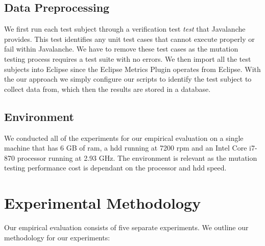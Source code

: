 \subsection{Data Preprocessing}
\label{subsec:experiment_data_preprocessing}
We first run each test subject through a verification test \emph{test} that Javalanche provides. This test identifies any unit test cases that cannot execute properly or fail within Javalanche. We have to remove these test cases as the mutation testing process requires a test suite with no errors. We then import all the test subjects into Eclipse since the Eclipse Metrics Plugin operates from Eclipse. With the our approach we simply configure our scripts to identify the test subject to collect data from, which then the results are stored in a database.


\subsection{Environment}
\label{subsec:experiment_environment}
We conducted all of the experiments for our empirical evaluation on a single machine that has 6 GB of \gls{ram}, a \gls{hdd} running at 7200 \gls{rpm}  and an Intel Core i7-870 processor running at 2.93 GHz. The environment is relevant as the mutation testing performance cost is dependant on the processor and \gls{hdd} speed.


\section{Experimental Methodology}
\label{sec:experiment_methodology}
Our empirical evaluation consists of five separate experiments. We outline our methodology for our experiments:

